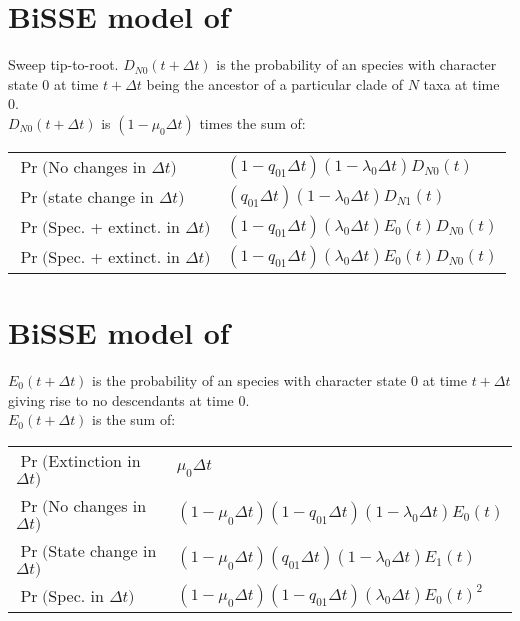 \documentclass[landscape]{foils}
\begin{document}
\myNewSlide
\section*{BiSSE model of \citet{MaddisonMO2007}}
Sweep tip-to-root. $D_{N0}(t+\Delta t)$ is the probability of an species with character state 0 at time $t+\Delta t$ being the ancestor of a particular clade of $N$ taxa at time 0. \\
$D_{N0}(t+\Delta t)$ is $(1-\mu_0\Delta t)$ times the sum of:
\begin{table}[htdp]
\begin{center}
\begin{tabular}{|l|l|}
\hline
 $\Pr($No changes in $\Delta t)$ & $(1-q_{01}\Delta t)(1-\lambda_0\Delta t)D_{N0}(t)$  \\
 $\Pr($state change in $\Delta t)$ & $(q_{01}\Delta t)(1-\lambda_0\Delta t)D_{N1}(t)$  \\
 $\Pr($Spec. + extinct. in $\Delta t)$ & $(1-q_{01}\Delta t)(\lambda_0\Delta t)E_0(t)D_{N0}(t)$  \\
 $\Pr($Spec. + extinct. in $\Delta t)$ & $(1-q_{01}\Delta t)(\lambda_0\Delta t)E_0(t)D_{N0}(t)$  \\
\hline
\end{tabular}
\end{center}
\label{default}
\end{table}%

\myNewSlide
\section*{BiSSE model of \citet{MaddisonMO2007}}
$E_{0}(t+\Delta t)$ is the probability of an species with character state 0 at time $t+\Delta t$ giving rise to no descendants at time 0. \\
$E_{0}(t+\Delta t)$ is  the sum of:
\begin{table}[htdp]
\begin{center}
\begin{tabular}{|l|l|}
\hline
 $\Pr($Extinction in $\Delta t)$ & $\mu_0\Delta t$  \\
 $\Pr($No changes in $\Delta t)$ & $(1-\mu_0\Delta t)(1-q_{01}\Delta t)(1-\lambda_0\Delta t)E_{0}(t)$  \\
 $\Pr($State change in $\Delta t)$ & $(1-\mu_0\Delta t)(q_{01}\Delta t)(1-\lambda_0\Delta t)E_{1}(t)$  \\
 $\Pr($Spec. in $\Delta t)$ &  $(1-\mu_0\Delta t)(1-q_{01}\Delta t)(\lambda_0\Delta t)E_{0}(t)^2$  \\
\hline
\end{tabular}
\end{center}
\label{default}
\end{table}%
\end{document}

